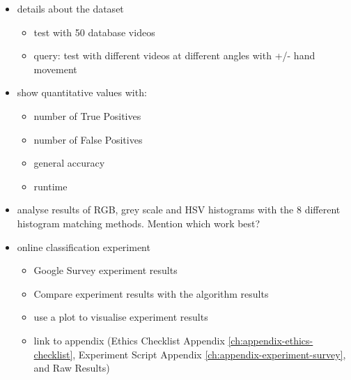 \begin{itemize}
    \item details about the dataset
    \begin{itemize}
        \item test with 50 database videos
        \item query: test with different videos at different angles with +/- hand movement
    \end{itemize}
    
    \item show quantitative values with:
    \begin{itemize}
        \item number of True Positives 
        \item number of False Positives
        \item general accuracy
        \item runtime
    \end{itemize}
    
    \item analyse results of RGB, grey scale and HSV histograms with the 8 different histogram matching methods. Mention which work best?
    
    \item online classification experiment
    \begin{itemize}
        \item Google Survey experiment results 
        \item Compare experiment results with the algorithm results
        \item use a plot to visualise experiment results
        \item link to appendix (Ethics Checklist Appendix \ref{ch:appendix-ethics-checklist}, Experiment Script Appendix \ref{ch:appendix-experiment-survey}, and Raw Results)
    \end{itemize}
\end{itemize}